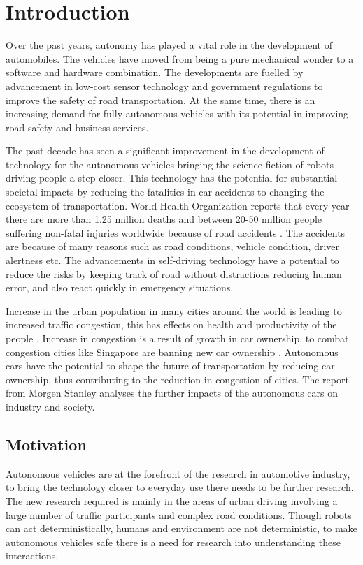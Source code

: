 \chapter{Introduction}
\label{introduction}

Over the past years, autonomy has played a vital role in the development of automobiles. The vehicles have moved from being a pure mechanical wonder to a software and hardware combination. The developments are fuelled by advancement in low-cost sensor technology and government regulations to improve the safety of road transportation. At the same time, there is an increasing demand for fully autonomous vehicles with its potential in improving road safety and business services.

The past decade has seen a significant improvement in the development of technology for the autonomous vehicles bringing the science fiction of robots driving people a step closer. This technology has the potential for substantial societal impacts by reducing the fatalities in car accidents to changing the ecosystem of transportation. World Health Organization reports that every year there are more than 1.25 million deaths and between 20-50 million people suffering non-fatal injuries worldwide because of road accidents \cite{whoaccidents}. The accidents are because of many reasons such as road conditions, vehicle condition, driver alertness etc. The advancements in self-driving technology have a potential to reduce the risks by keeping track of road without distractions reducing human error, and also react quickly in emergency situations.

Increase in the urban population in many cities around the world is leading to increased traffic congestion, this has effects on health and productivity of the people \cite{citycongestion}. Increase in congestion is a result of growth in car ownership, to combat congestion cities like Singapore are banning new car ownership \cite{singaporebanscars}. Autonomous cars have the potential to shape the future of transportation by reducing car ownership, thus contributing to the reduction in congestion of cities. The report \cite{morgenstanleyreport} from Morgen Stanley analyses the further impacts of the autonomous cars on industry and society. 


\section{Motivation}

Autonomous vehicles are at the forefront of the research in automotive industry, to bring the technology closer to everyday use there needs to be further research. The new research required is mainly in the areas of urban driving involving a large number of traffic participants and complex road conditions. Though robots can act deterministically, humans and environment are not deterministic, to make autonomous vehicles safe there is a need for research into understanding these interactions.

